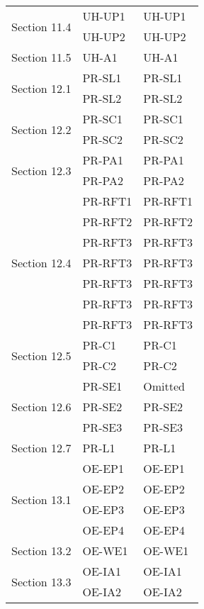\documentclass[12pt, titlepage]{article}
\begin{document}
\begin{longtable}{|p{3cm}|p{4cm}|p{8cm}|}
  \hline
  \multirow{2}{3cm}{Section 11.4} 
  & UH-UP1 & UH-UP1 \\
  \cline{2-3}
  & UH-UP2 & UH-UP2 \\
  \hline
  \multirow{1}{3cm}{Section 11.5} 
  & UH-A1 & UH-A1 \\
  \hline
  \multirow{2}{3cm}{Section 12.1} 
  & PR-SL1 & PR-SL1 \\
  \cline{2-3}
  & PR-SL2 & PR-SL2 \\
  \hline
  \multirow{2}{3cm}{Section 12.2} 
  & PR-SC1 & PR-SC1 \\
  \cline{2-3}
  & PR-SC2 & PR-SC2 \\
  \hline
  \multirow{2}{3cm}{Section 12.3} 
  & PR-PA1 & PR-PA1 \\
  \cline{2-3}
  & PR-PA2 & PR-PA2 \\
  \hline
  \multirow{7}{3cm}{Section 12.4} 
  & PR-RFT1 & PR-RFT1 \\
  \cline{2-3}
  & PR-RFT2 & PR-RFT2 \\
  \cline{2-3}
  & PR-RFT3 & PR-RFT3 \\
  \cline{2-3}
  & PR-RFT3 & PR-RFT3 \\
  \cline{2-3}
  & PR-RFT3 & PR-RFT3 \\
  \cline{2-3}
  & PR-RFT3 & PR-RFT3 \\
  \cline{2-3}
  & PR-RFT3 & PR-RFT3 \\
  \hline
  \multirow{2}{3cm}{Section 12.5} 
  & PR-C1 & PR-C1 \\
  \cline{2-3}
  & PR-C2 & PR-C2 \\
  \hline
  \multirow{3}{3cm}{Section 12.6} 
  & PR-SE1 & Omitted \\
  \cline{2-3}
  & PR-SE2 & PR-SE2 \\
  \cline{2-3}
  & PR-SE3 & PR-SE3 \\
  \hline
  \multirow{1}{3cm}{Section 12.7} 
  & PR-L1 & PR-L1 \\
  \hline
  \multirow{4}{3cm}{Section 13.1} 
  & OE-EP1 & OE-EP1 \\
  \cline{2-3}
  & OE-EP2 & OE-EP2 \\
  \cline{2-3}
  & OE-EP3 & OE-EP3 \\
  \cline{2-3}
  & OE-EP4 & OE-EP4 \\
  \hline
  \multirow{1}{3cm}{Section 13.2} 
  & OE-WE1 & OE-WE1 \\
  \hline
  \multirow{3}{3cm}{Section 13.3} 
  & OE-IA1 & OE-IA1 \\
  \cline{2-3}
  & OE-IA2 & OE-IA2 \\

\end{longtable}
\end{document}
